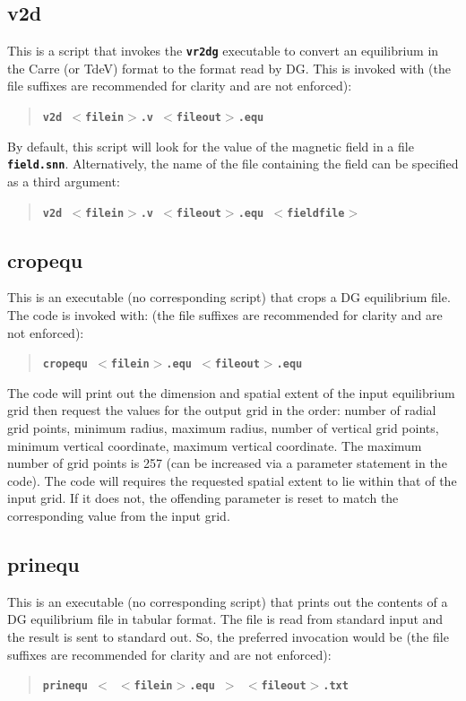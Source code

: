 \documentclass[12pt]{report}
\begin{document}
\subsection{v2d}

This is a script that invokes the \textbf{\texttt{vr2dg}} 
executable to convert an equilibrium in the Carre (or TdeV) format
to the format read by DG. 
This is invoked with (the file suffixes are recommended for clarity
and are not enforced):
\begin{quote}
\textbf{\texttt{v2d $<$filein$>$.v $<$fileout$>$.equ}}
\end{quote}
By default, this script will look for the value of the magnetic field
in a file \textbf{\texttt{field.snn}}. 
Alternatively, the name of the file containing the field can be 
specified as a third argument:
\begin{quote}
\textbf{\texttt{v2d $<$filein$>$.v $<$fileout$>$.equ $<$fieldfile$>$}}
\end{quote}
\subsection{cropequ}

This is an executable (no corresponding script) that crops a
DG equilibrium file.  The code is invoked with:
(the file suffixes are recommended for clarity
and are not enforced):
\begin{quote}
\textbf{\texttt{cropequ $<$filein$>$.equ $<$fileout$>$.equ}}
\end{quote}
The code will print out the dimension and spatial extent of the input
equilibrium grid then request the values for the output grid in the
order: number of radial grid points, minimum radius, maximum radius,
number of vertical grid points, minimum vertical coordinate, 
maximum vertical coordinate.  The maximum number of grid points is 257
(can be increased via a parameter statement in the code).  The code
will requires the requested spatial extent to lie within that of the
input grid.  If it does not, the offending parameter is reset to
match the corresponding value from the input grid.

\subsection{prinequ}

This is an executable (no corresponding script) that prints out the
contents of a DG equilibrium file in tabular format.  The file 
is read from standard input and the result is sent to standard out.
So, the preferred invocation would be
(the file suffixes are recommended for clarity
and are not enforced):
\begin{quote}
\textbf{\texttt{prinequ $<$ $<$filein$>$.equ $>$ $<$fileout$>$.txt}}
\end{quote}
\end{document}
